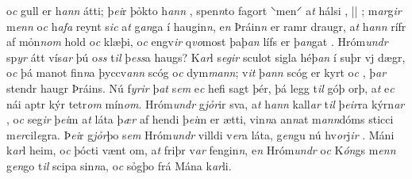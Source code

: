 o\textit{c} gull   er h\textit{ann} átti; þ\textit{ei}r þỏkto h\textit{ann} , spen\textit{n}to fagort ⸌men⸍  a\textit{t} hálsi  ,    
||
 ; m\textit{ar}g\textit{ir} m\textit{enn} o\textit{c}  h\textit{afa} reynt s\textit{ic}  a\textit{t} g\textit{an}ga í haugin\textit{n}, e\textit{n}
Þráin\textit{n} er ramr draugr, a\textit{t} h\textit{ann} rífr af mỏn\textit{n}\textit{om} hold  o\textit{c} klæþi, o\textit{c}
engv\textit{ir} q\textit{vo}most þaþ\textit{an} lífs er þ\textit{an}gat  . Hróm\textit{undr} sp\textit{yr}  átt vís\textit{ar} þú o\textit{ss} t\textit{il} þ\textit{ess}a haugs?
K\textit{ar}l s\textit{egir}  sculot 
sigla héþ\textit{an} í suþr   vj dægr, o\textit{c} þá manot   fin\textit{n}a   þyccv\textit{an}\textit{n}  scóg o\textit{c}
dym\textit{m}\textit{an}\textit{n}; v\textit{it} þ\textit{an}\textit{n} scóg
er   kyrt o\textit{c} , þ\textit{ar} stendr haugr Þráins. Nú f\textit{yrir} þ\textit{at}
s\textit{em} e\textit{c} hefi  sagt þér, þá legg t\textit{il}   góþ orþ, a\textit{t} e\textit{c} nái aptr kýr tetr\textit{om} mín\textit{om}. 
Hróm\textit{undr} g\textit{jỏr}ir sva, a\textit{t} h\textit{ann} kall\textit{ar} t\textit{il} þ\textit{eir}ra   kýrn\textit{ar} , o\textit{c} seg\textit{ir} þ\textit{ei}m a\textit{t} láta þ\textit{ær}
af hendi þ\textit{ei}m er  ætti,   vin\textit{n}a an\textit{n}at   m\textit{ann}dóms   sticci
m\textit{er}cil\textit{e}gra. Þ\textit{ei}r g\textit{jỏr}þo   s\textit{em} Hróm\textit{undr} villdi v\textit{er}a láta, g\textit{en}gu
nú hv\textit{or}j\textit{ir} .  Máni k\textit{ar}l   heim, o\textit{c} þócti vænt om, a\textit{t} friþr v\textit{ar} fengin\textit{n}, e\textit{n} Hróm\textit{undr} o\textit{c}
K\textit{ón}gs m\textit{enn} g\textit{en}go t\textit{il} scipa sin\textit{n}a,
o\textit{c} sỏgþo frá  Mána k\textit{ar}li. 
\pend \endnumbering  

